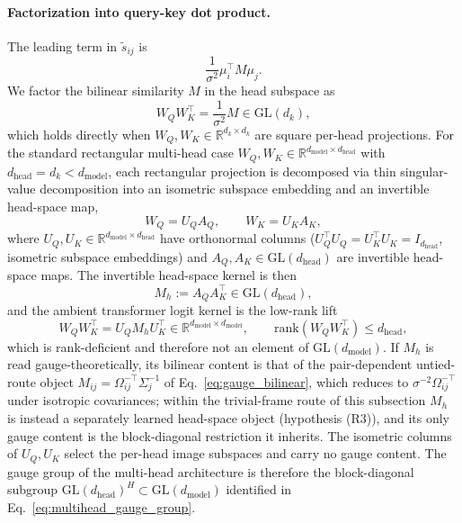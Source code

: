 \documentclass[11pt]{article}
\begin{document}
\paragraph{Factorization into query-key dot product.}
The leading term in $\tilde{s}_{ij}$ is
\begin{equation}
\frac{1}{\sigma^2}\mu_i^\top M \mu_j.
\end{equation}
We factor the bilinear similarity $M$ in the head subspace as
\begin{equation}
W_Q W_K^\top = \frac{1}{\sigma^2} M \in \mathrm{GL}(d_k),
\label{eq:wqwk_square}
\end{equation}
which holds directly when $W_Q, W_K \in \mathbb{R}^{d_k \times d_k}$ are square per-head projections. For the standard rectangular multi-head case $W_Q, W_K \in \mathbb{R}^{d_{\text{model}}\times d_{\text{head}}}$ with $d_{\text{head}} = d_k < d_{\text{model}}$, each rectangular projection is decomposed via thin singular-value decomposition into an isometric subspace embedding and an invertible head-space map,
\begin{equation}
W_Q = U_Q A_Q, \qquad W_K = U_K A_K,
\label{eq:thin_svd_decomposition}
\end{equation}
where $U_Q, U_K \in \mathbb{R}^{d_{\text{model}}\times d_{\text{head}}}$ have orthonormal columns ($U_Q^\top U_Q = U_K^\top U_K = I_{d_{\text{head}}}$, isometric subspace embeddings) and $A_Q, A_K \in \mathrm{GL}(d_{\text{head}})$ are invertible head-space maps. The invertible head-space kernel is then
\begin{equation}
M_h := A_Q A_K^\top \in \mathrm{GL}(d_{\text{head}}),
\label{eq:head_space_kernel_participatory}
\end{equation}
and the ambient transformer logit kernel is the low-rank lift
\begin{equation}
W_Q W_K^\top = U_Q M_h U_K^\top \in \mathbb{R}^{d_{\text{model}}\times d_{\text{model}}}, \qquad \mathrm{rank}(W_Q W_K^\top) \le d_{\text{head}},
\label{eq:low_rank_lift}
\end{equation}
which is rank-deficient and therefore not an element of $\mathrm{GL}(d_{\text{model}})$. If $M_h$ is read gauge-theoretically, its bilinear content is that of the pair-dependent untied-route object $M_{ij} = \Omega_{ij}^{-\top}\Sigma_j^{-1}$ of Eq.~\eqref{eq:gauge_bilinear}, which reduces to $\sigma^{-2}\Omega_{ij}^{-\top}$ under isotropic covariances; within the trivial-frame route of this subsection $M_h$ is instead a separately learned head-space object (hypothesis (R3)), and its only gauge content is the block-diagonal restriction it inherits. The isometric columns of $U_Q, U_K$ select the per-head image subspaces and carry no gauge content. The gauge group of the multi-head architecture is therefore the block-diagonal subgroup $\mathrm{GL}(d_{\text{head}})^H \subset \mathrm{GL}(d_{\text{model}})$ identified in Eq.~\eqref{eq:multihead_gauge_group}.
\end{document}

